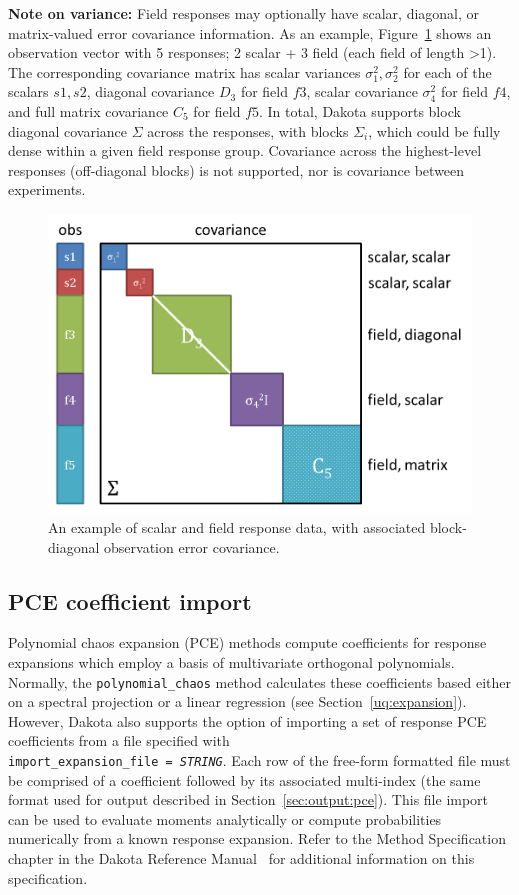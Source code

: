 {\bf Note on variance:} Field responses may optionally have scalar,
diagonal, or matrix-valued error covariance information.  As an
example, Figure~\ref{fig:input:obs_err_cov} shows an observation
vector with 5 responses; 2 scalar + 3 field (each field of length
\textgreater 1).  The corresponding covariance matrix has scalar
variances $\sigma_1^2, \sigma_2^2$ for each of the scalars $s1, s2$,
diagonal covariance $D_3$ for field $f3$, scalar covariance
$\sigma_4^2$ for field $f4$, and full matrix covariance $C_5$ for
field $f5$.  In total, Dakota supports block diagonal covariance
$\Sigma$ across the responses, with blocks $\Sigma_i$, which could be
fully dense within a given field response group.  Covariance across
the highest-level responses (off-diagonal blocks) is not supported,
nor is covariance between experiments.
\begin{figure}[htbp!]
  \centering
  \includegraphics[scale=0.5]{images/ObsErrorCovariance}
  \caption{An example of scalar and field response data, with
    associated block-diagonal observation error covariance.}
  \label{fig:input:obs_err_cov}
\end{figure}

\subsection{PCE coefficient import}

Polynomial chaos expansion (PCE) methods compute coefficients for
response expansions which employ a basis of multivariate orthogonal
polynomials.  Normally, the \texttt{polynomial\_chaos} method
calculates these coefficients based either on a spectral projection or
a linear regression (see Section~\ref{uq:expansion}).  However, Dakota
also supports the option of importing a set of response PCE
coefficients from a file specified with \\
\texttt{import\_expansion\_file = \emph{STRING}}.  Each row of the
free-form formatted file must be comprised of a coefficient followed
by its associated multi-index (the same format used for output
described in Section~\ref{sec:output:pce}).  This file import can be
used to evaluate moments analytically or compute probabilities
numerically from a known response expansion.  Refer to the Method
Specification chapter in the Dakota Reference Manual~\cite{RefMan} for
additional information on this specification.

